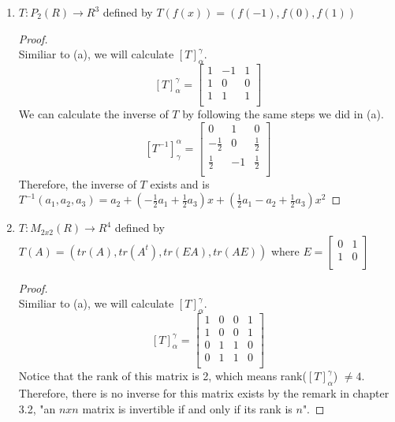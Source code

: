 \documentclass[11pt]{scrartcl}
\begin{document}
\begin{enumerate}[label=\alph*.]
{	}

	\item{
		$T:P_2(R) \rightarrow R^3$ defined by $T(f(x)) = (f(-1),f(0),f(1))$
		\begin{proof}
		\-\\
		Similiar to (a), we will calculate $[T]_{\alpha}^{\gamma}$.
		\[
		[T]_{\alpha}^{\gamma} = 
		\begin{bmatrix}
			1 & -1 & 1\\
			1 & 0 & 0\\
			1 & 1 & 1 \\
		\end{bmatrix}
		\]
		We can calculate the inverse of $T$ by following the same steps we did in (a).
		\[
		[T^{-1}]_{\gamma}^{\alpha} = 
		\begin{bmatrix}
			0 & 1 & 0\\
			-\frac12 & 0 & \frac12\\
			\frac12 & -1 & \frac12\\
		\end{bmatrix}
		\]
		Therefore, the inverse of $T$ exists and is \\$T^{-1}(a_1, a_2, a_3) 
		=a_2 + (-\frac12 a_1 + \frac12 a_3)x + (\frac12a_1 -a_2 + \frac12a_3)x^2$
		\end{proof}
		}

		\item{
		$T:M_{2x2}(R) \rightarrow R^4$ defined by $T(A) = (tr(A), tr(A^t), tr(EA), tr(AE))$
		where 
		$E = 
		\begin{bmatrix}
		0 & 1 \\
		1 & 0 \\ 
		\end{bmatrix}
		$
		\begin{proof}
		\-\\
		Similiar to (a), we will calculate $[T]_{\alpha}^{\gamma}$.
		\[
		[T]_{\alpha}^{\gamma} = 
		\begin{bmatrix}
			1 & 0 & 0 & 1\\
			1 & 0 & 0 & 1\\
			0 & 1 & 1 & 0\\
			0 & 1 & 1 & 0\\
		\end{bmatrix}
		\]
		Notice that the rank of this matrix is 2, which means rank($[T]_{\alpha}^{\gamma}$) $\neq 4$.
		Therefore, there is no inverse for this matrix exists by the remark in chapter 3.2,
		"an $nxn$ matrix is invertible if and only if its rank is $n$".
		\end{proof}
		}
\end{enumerate}
\end{document}
